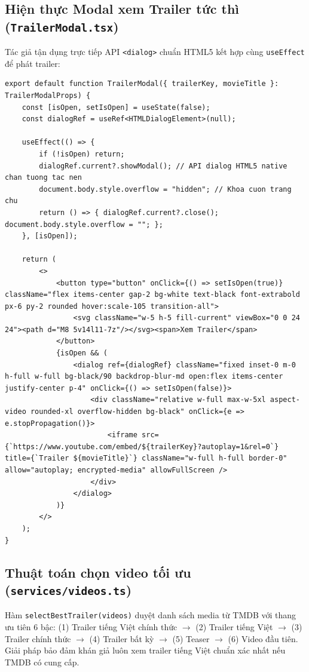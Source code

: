 \documentclass[12pt,a4paper]{extarticle}
\begin{document}
\subsection{Hiện thực Modal xem Trailer tức thì (\texttt{TrailerModal.tsx})}
Tác giả tận dụng trực tiếp API \texttt{<dialog>} chuẩn HTML5 kết hợp cùng \texttt{useEffect} để phát trailer:

\begin{lstlisting}[caption={Hiện thực TrailerModal tối giản bằng thẻ dialog HTML5}]
export default function TrailerModal({ trailerKey, movieTitle }: TrailerModalProps) {
    const [isOpen, setIsOpen] = useState(false);
    const dialogRef = useRef<HTMLDialogElement>(null);

    useEffect(() => {
        if (!isOpen) return;
        dialogRef.current?.showModal(); // API dialog HTML5 native chan tuong tac nen
        document.body.style.overflow = "hidden"; // Khoa cuon trang chu
        return () => { dialogRef.current?.close(); document.body.style.overflow = ""; };
    }, [isOpen]);

    return (
        <>
            <button type="button" onClick={() => setIsOpen(true)} className="flex items-center gap-2 bg-white text-black font-extrabold px-6 py-2 rounded hover:scale-105 transition-all">
                <svg className="w-5 h-5 fill-current" viewBox="0 0 24 24"><path d="M8 5v14l11-7z"/></svg><span>Xem Trailer</span>
            </button>
            {isOpen && (
                <dialog ref={dialogRef} className="fixed inset-0 m-0 h-full w-full bg-black/90 backdrop-blur-md open:flex items-center justify-center p-4" onClick={() => setIsOpen(false)}>
                    <div className="relative w-full max-w-5xl aspect-video rounded-xl overflow-hidden bg-black" onClick={e => e.stopPropagation()}>
                        <iframe src={`https://www.youtube.com/embed/${trailerKey}?autoplay=1&rel=0`} title={`Trailer ${movieTitle}`} className="w-full h-full border-0" allow="autoplay; encrypted-media" allowFullScreen />
                    </div>
                </dialog>
            )}
        </>
    );
}
\end{lstlisting}

\subsection{Thuật toán chọn video tối ưu (\texttt{services/videos.ts})}
Hàm \texttt{selectBestTrailer(videos)} duyệt danh sách media từ TMDB với thang ưu tiên 6 bậc: (1) Trailer tiếng Việt chính thức $\rightarrow$ (2) Trailer tiếng Việt $\rightarrow$ (3) Trailer chính thức $\rightarrow$ (4) Trailer bất kỳ $\rightarrow$ (5) Teaser $\rightarrow$ (6) Video đầu tiên. Giải pháp bảo đảm khán giả luôn xem trailer tiếng Việt chuẩn xác nhất nếu TMDB có cung cấp.
\end{document}
